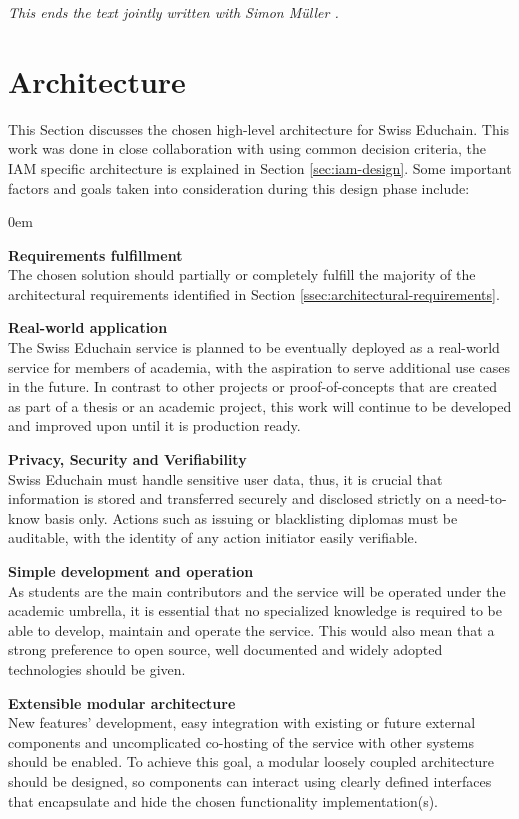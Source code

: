 \emph{This ends the text jointly written with Simon M{\"u}ller \cite{mueller20}.}

\section{Architecture} \label{sec:design-architecture}

This Section discusses the chosen high-level architecture for Swiss Educhain. This work was done in close collaboration with \cite{mueller20} using common decision criteria, the IAM specific architecture is explained in Section \ref{sec:iam-design}. Some important factors and goals taken into consideration during this design phase include:

\begin{description}
	\itemsep0em
	\item\textbf{Requirements fulfillment}  \hfill \\ 
	The chosen solution should partially or completely fulfill the majority of the architectural requirements identified in Section \ref{ssec:architectural-requirements}.
	\item\textbf{Real-world application}  \hfill \\ 
	The Swiss Educhain service is planned to be eventually deployed as a real-world service for members of academia, with the aspiration to serve additional use cases in the future. In contrast to other projects or proof-of-concepts that are created as part of a thesis or an academic project, this work will continue to be developed and improved upon until it is production ready.
	\item\textbf{Privacy, Security and Verifiability}  \hfill \\ 
	Swiss Educhain must handle sensitive user data, thus, it is crucial that information is stored and transferred securely and disclosed strictly on a need-to-know basis only. Actions such as issuing or blacklisting diplomas must be auditable, with the identity of any action initiator easily verifiable.
	\item\textbf{Simple development and operation}  \hfill \\ 
	As students are the main contributors and the service will be operated under the academic umbrella, it is essential that no specialized knowledge is required to be able to develop, maintain and operate the service. This would also mean that a strong preference to open source, well documented and widely adopted technologies should be given.
	\item\textbf{Extensible modular architecture}  \hfill \\ 
	New features' development, easy integration with existing or future external components and uncomplicated co-hosting of the service with other systems should be enabled. To achieve this goal, a modular loosely coupled architecture should be designed, so components can interact using clearly defined interfaces that encapsulate and hide the chosen functionality implementation(s).
\end{description}

